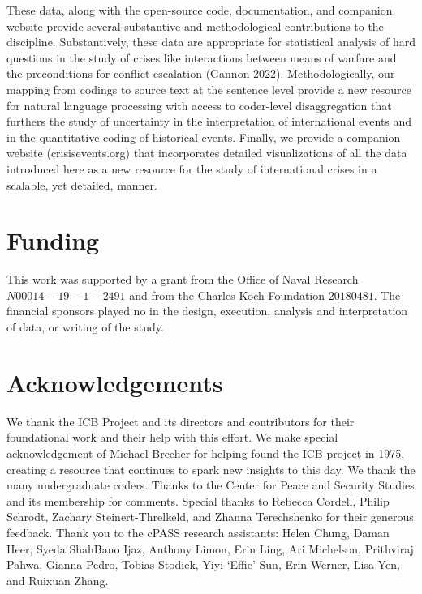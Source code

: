 \documentclass{article}
\begin{document}
These data, along with the open-source code, documentation, and
companion website provide several substantive and methodological
contributions to the discipline. Substantively, these data are
appropriate for statistical analysis of hard questions in the study of
crises like interactions between means of warfare and the preconditions
for conflict escalation (Gannon 2022). Methodologically, our mapping
from codings to source text at the sentence level provide a new resource
for natural language processing with access to coder-level
disaggregation that furthers the study of uncertainty in the
interpretation of international events and in the quantitative coding of
historical events. Finally, we provide a companion website
(crisisevents.org) that incorporates detailed visualizations of all the
data introduced here as a new resource for the study of international
crises in a scalable, yet detailed, manner.

\hypertarget{funding}{%
\section{Funding}\label{funding}}

This work was supported by a grant from the Office of Naval Research
\(N00014-19-1-2491\) and from the Charles Koch Foundation \(20180481\).
The financial sponsors played no in the design, execution, analysis and
interpretation of data, or writing of the study.

\hypertarget{acknowledgements}{%
\section{Acknowledgements}\label{acknowledgements}}

We thank the ICB Project and its directors and contributors for their
foundational work and their help with this effort. We make special
acknowledgement of Michael Brecher for helping found the ICB project in
1975, creating a resource that continues to spark new insights to this
day. We thank the many undergraduate coders. Thanks to the Center for
Peace and Security Studies and its membership for comments. Special
thanks to Rebecca Cordell, Philip Schrodt, Zachary Steinert-Threlkeld,
and Zhanna Terechshenko for their generous feedback. Thank you to the
cPASS research assistants: Helen Chung, Daman Heer, Syeda ShahBano Ijaz,
Anthony Limon, Erin Ling, Ari Michelson, Prithviraj Pahwa, Gianna Pedro,
Tobias Stodiek, Yiyi `Effie' Sun, Erin Werner, Lisa Yen, and Ruixuan
Zhang.
\end{document}
